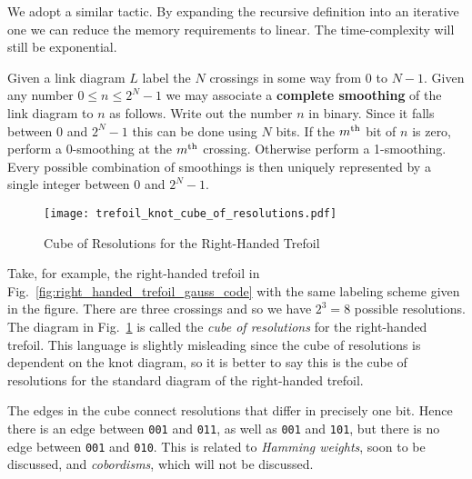         We adopt a similar tactic. By expanding the
        recursive definition into an iterative one we can reduce the memory
        requirements to linear. The time-complexity will still be exponential.
        \par\hfill\par
        Given a link diagram $L$ label the $N$ crossings in some way from $0$
        to $N-1$. Given any number $0\leq{n}\leq{2}^{N}-1$ we may associate a
        \textbf{complete smoothing} of the link diagram to $n$ as follows.
        Write out the number $n$ in binary. Since it falls between $0$ and
        $2^{N}-1$ this can be done using $N$ bits. If the
        $m^{\small\textrm{th}}$ bit of $n$ is zero, perform a 0-smoothing at
        the $m^{\small\textrm{th}}$ crossing. Otherwise perform a 1-smoothing.
        Every possible combination of smoothings is then uniquely represented
        by a single integer between $0$ and $2^{N}-1$.
        \par\hfill\par
        \begin{figure}
            \centering
            \texttt{[image: trefoil\_knot\_cube\_of\_resolutions.pdf]}
            \caption{Cube of Resolutions for the Right-Handed Trefoil}
            \label{fig:trefoil_knot_cube_of_resolutions}
        \end{figure}
        Take, for example, the right-handed trefoil in
        Fig.~\ref{fig:right_handed_trefoil_gauss_code} with the same labeling
        scheme given in the figure. There are three crossings and so we have
        $2^{3}=8$ possible resolutions. The diagram
        in Fig.~\ref{fig:trefoil_knot_cube_of_resolutions} is called the
        \textit{cube of resolutions} for the right-handed trefoil.
        This language is slightly misleading since the cube of
        resolutions is dependent on the knot diagram, so it is better to say
        this is the cube of resolutions for the standard diagram of
        the right-handed trefoil.
        \par\hfill\par
        The edges in the cube connect resolutions that differ in precisely one
        bit. Hence there is an edge between \texttt{001} and \texttt{011},
        as well as \texttt{001} and \texttt{101}, but there is no edge between
        \texttt{001} and \texttt{010}. This is related to
        \textit{Hamming weights}, soon to be discussed, and \textit{cobordisms},
        which will not be discussed.
        \par\hfill\par
